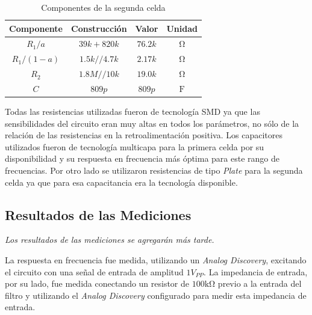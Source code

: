 \begin{table}[ht]
\begin{center}
\begin{tabular}{||c|c|c|c||}
\hline
Componente	&	Construcción	&	Valor	&	Unidad	\\
\hline
$R_1/a$	&	$39k + 820 k$	&	$76.2 k$	&	$\si{\ohm}$	\\
$R_1/(1-a)$	&	$1.5k // 4.7 k$	&	$2.17 k$	&	$\si{\ohm}$	\\
$R_2$ &	$1.8 M // 10 k$	&$19.0k$&	$\si{\ohm}$	\\
$C$	&	$809 p$	&	$809 p$	&	$\si{\farad}$	\\
\hline
\end{tabular}
\caption{Componentes de la segunda celda}
\label{tab:e2 comp cell 2}
\end{center}
\end{table}

Todas las resistencias utilizadas fueron de tecnología SMD ya que las sensibilidades del circuito eran muy altas en todos los parámetros, no sólo de la relación de las resistencias en la retroalimentación positiva. Los capacitores utilizados fueron de tecnología multicapa para la primera celda por su disponibilidad y su respuesta en frecuencia más óptima para este rango de frecuencias. Por otro lado se utilizaron resistencias de tipo \textit{Plate} para la segunda celda ya que para esa capacitancia era la tecnología disponible.

\subsection{Resultados de las Mediciones}

\textit{Los resultados de las mediciones se agregarán más tarde.}

La respuesta en frecuencia fue medida, utilizando un \textit{Analog Discovery}, excitando el circuito con una señal de entrada de amplitud $1 V_{PP}$. La impedancia de entrada, por su lado, fue medida conectando un resistor de $100 \si{\kilo\ohm}$ previo a la entrada del filtro y utilizando el \textit{Analog Discovery} configurado para medir esta impedancia de entrada.

